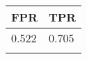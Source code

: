 \begin{tabular}{ll}
\hline
 FPR   & TPR   \\
\hline
 0.522 & 0.705 \\
       &       \\
\hline
\end{tabular}